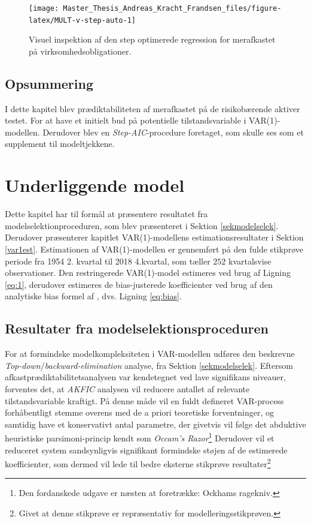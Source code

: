 \documentclass[
  a4paper,
  oneside]{memoir}
\begin{document}
\begin{figure}[H]

{\centering \texttt{[image: Master\_Thesis\_Andreas\_Kracht\_Frandsen\_files/figure-latex/MULT-v-step-auto-1]} 

}

\caption{Visuel inspektion af den step optimerede regression for merafkastet på virksomhedsobligationer.}\label{fig:MULT-v-step-auto}
\end{figure}

\hypertarget{opsreg}{%
\section{Opsummering}\label{opsreg}}

I dette kapitel blev prædiktabiliteten af merafkastet på de risikobærende aktiver testet. For at have et initielt bud på potentielle tilstandsvariable i VAR(1)-modellen. Derudover blev en \emph{Step-AIC}-procedure foretaget, som skulle ses som et supplement til modeltjekkene.

\hypertarget{underligmodel}{%
\chapter{Underliggende model}\label{underligmodel}}

Dette kapitel har til formål at præsentere resultatet fra modelselektionproceduren, som blev præsenteret i Sektion \ref{sekmodelselek}. Derudover præsenterer kapitlet VAR(1)-modellens estimationsresultater i Sektion \ref{var1est}. Estimationen af VAR(1)-modellen er gennemført på den fulde stikprøve periode fra 1954 2. kvartal til 2018 4.kvartal, som tæller \(252\) kvartalsvise observationer. Den restringerede VAR(1)-model estimeres ved brug af Ligning \eqref{eq:1}, derudover estimeres de bias-justerede koefficienter ved brug af den analytiske bias formel af \citep{Pope1990}, dvs. Ligning \eqref{eq:bias}.

\hypertarget{resframodelsel}{%
\section{Resultater fra modelselektionsproceduren}\label{resframodelsel}}

For at formindske modelkompleksiteten i VAR-modellen udføres den beskrevne \emph{Top-down}/\emph{backward-elimination} analyse, fra Sektion \ref{sekmodelselek}. Eftersom afkastprædiktabilitetsanalysen var kendetegnet ved lave signifikans niveauer, forventes det, at \emph{AKFIC} analysen vil reducere antallet af relevante tilstandsvariable kraftigt. På denne måde vil en fuldt defineret VAR-process forhåbentligt stemme overens med de a priori teoretiske forventninger, og samtidig have et konservativt antal parametre, der givetvis vil følge det abduktive heuristiske parsimoni-princip kendt som \emph{Occam's Razor}\footnote{Den fordanskede udgave er næsten at foretrække: Ockhams ragekniv.} Derudover vil et reduceret system sandsynligvis signifikant formindske støjen af de estimerede koefficienter, som dermed vil lede til bedre eksterne stikprøve resultater\footnote{Givet at denne stikprøve er repræsentativ for modelleringsstikprøven.}
\end{document}
